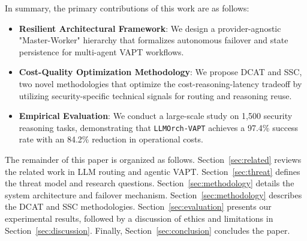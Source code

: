 In summary, the primary contributions of this work are as follows:
\begin{itemize}
    \item \textbf{Resilient Architectural Framework}: We design a provider-agnostic "Master-Worker" hierarchy that formalizes autonomous failover and state persistence for multi-agent VAPT workflows.
    \item \textbf{Cost-Quality Optimization Methodology}: We propose DCAT and SSC, two novel methodologies that optimize the cost-reasoning-latency tradeoff by utilizing security-specific technical signals for routing and reasoning reuse.
    \item \textbf{Empirical Evaluation}: We conduct a large-scale study on 1,500 security reasoning tasks, demonstrating that \texttt{LLMOrch-VAPT} achieves a 97.4\% success rate with an 84.2\% reduction in operational costs.
\end{itemize}

The remainder of this paper is organized as follows. Section~\ref{sec:related} reviews the related work in LLM routing and agentic VAPT. Section~\ref{sec:threat} defines the threat model and research questions. Section~\ref{sec:methodology} details the system architecture and failover mechanism. Section~\ref{sec:methodology} describes the DCAT and SSC methodologies. Section~\ref{sec:evaluation} presents our experimental results, followed by a discussion of ethics and limitations in Section~\ref{sec:discussion}. Finally, Section~\ref{sec:conclusion} concludes the paper.
